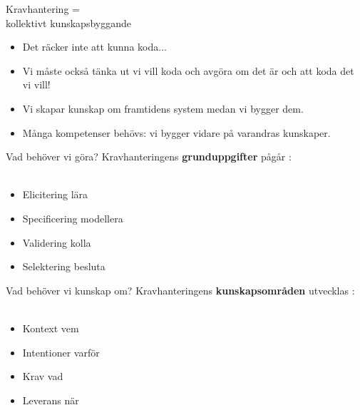 \documentclass{simpleslides}
\begin{document}
\begin{Slide}{\fontsize{20}{12}\selectfont Kravhantering =\\kollektivt kunskapsbyggande}
\begin{itemize}
\item Det räcker inte att kunna koda... 
\pause
\item Vi måste också tänka ut  vi vill koda och avgöra om det är  och  att koda det vi vill!
\pause 
\item Vi skapar kunskap om framtidens system medan vi bygger dem.
\item Många kompetenser behövs: vi bygger vidare på varandras kunskaper.
\end{itemize}
\end{Slide}



\begin{Slide}{Vad behöver vi göra?}
Kravhanteringens  \textbf{grunduppgifter} pågår : \\~
\begin{itemize}
\item Elicitering \hfill lära
\item Specificering  \hfill modellera
\item Validering \hfill kolla
\item Selektering \hfill besluta
\end{itemize}
\end{Slide}

\begin{Slide}{Vad behöver vi kunskap om?}
Kravhanteringens  \textbf{kunskapsområden} utvecklas : \\~
\begin{itemize}
\item Kontext \hfill vem
\item Intentioner  \hfill varför
\item Krav \hfill vad
\item Leverans \hfill när
\end{itemize}
\end{Slide}
\end{document}
